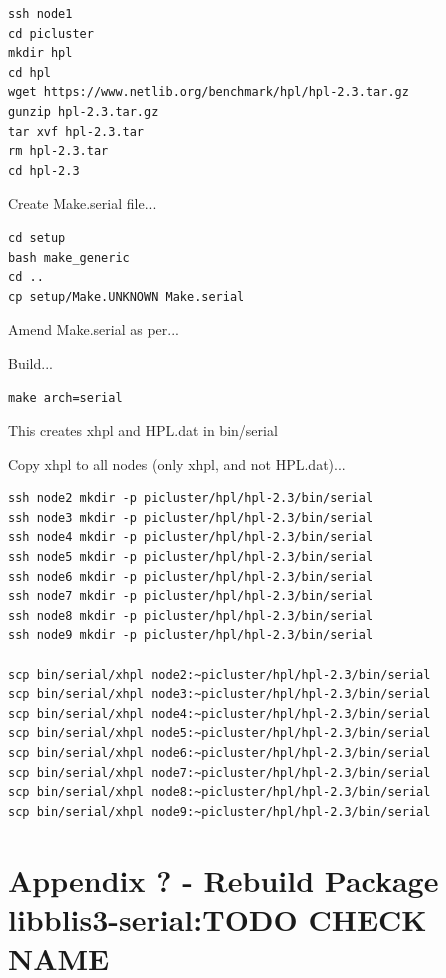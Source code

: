 \documentclass{article}
\begin{document}
\begin{lstlisting}[]
ssh node1
cd picluster
mkdir hpl
cd hpl
wget https://www.netlib.org/benchmark/hpl/hpl-2.3.tar.gz
gunzip hpl-2.3.tar.gz
tar xvf hpl-2.3.tar
rm hpl-2.3.tar
cd hpl-2.3
\end{lstlisting}

Create Make.serial file...

\begin{lstlisting}[]
cd setup
bash make_generic
cd ..
cp setup/Make.UNKNOWN Make.serial
\end{lstlisting}

Amend Make.serial as per...

Build...

\begin{lstlisting}[]
make arch=serial   
\end{lstlisting}

This creates xhpl and HPL.dat in bin/serial

Copy xhpl to all nodes (only xhpl, and not HPL.dat)...

\begin{lstlisting}[]
ssh node2 mkdir -p picluster/hpl/hpl-2.3/bin/serial
ssh node3 mkdir -p picluster/hpl/hpl-2.3/bin/serial
ssh node4 mkdir -p picluster/hpl/hpl-2.3/bin/serial
ssh node5 mkdir -p picluster/hpl/hpl-2.3/bin/serial
ssh node6 mkdir -p picluster/hpl/hpl-2.3/bin/serial
ssh node7 mkdir -p picluster/hpl/hpl-2.3/bin/serial
ssh node8 mkdir -p picluster/hpl/hpl-2.3/bin/serial
ssh node9 mkdir -p picluster/hpl/hpl-2.3/bin/serial

scp bin/serial/xhpl node2:~picluster/hpl/hpl-2.3/bin/serial
scp bin/serial/xhpl node3:~picluster/hpl/hpl-2.3/bin/serial
scp bin/serial/xhpl node4:~picluster/hpl/hpl-2.3/bin/serial
scp bin/serial/xhpl node5:~picluster/hpl/hpl-2.3/bin/serial
scp bin/serial/xhpl node6:~picluster/hpl/hpl-2.3/bin/serial
scp bin/serial/xhpl node7:~picluster/hpl/hpl-2.3/bin/serial
scp bin/serial/xhpl node8:~picluster/hpl/hpl-2.3/bin/serial
scp bin/serial/xhpl node9:~picluster/hpl/hpl-2.3/bin/serial
\end{lstlisting}



%
%
\clearpage\section{Appendix ? - Rebuild Package libblis3-serial:TODO CHECK NAME}
\end{document}

